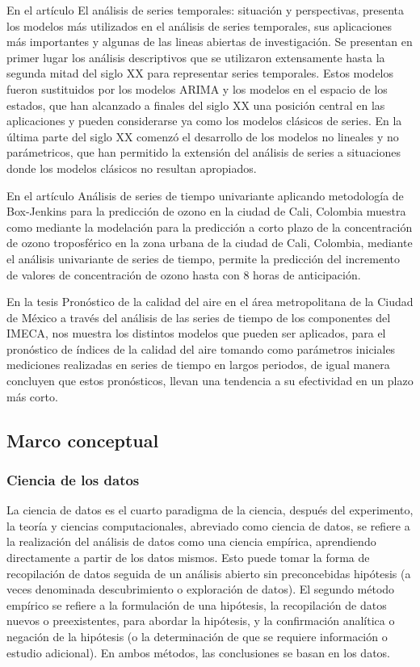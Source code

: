 En el artículo El análisis de series temporales: situación y perspectivas, presenta los modelos más utilizados en el análisis de series temporales, sus aplicaciones más importantes y algunas de las lineas abiertas de investigación. Se presentan en primer lugar los análisis descriptivos que se utilizaron extensamente hasta la segunda mitad del siglo XX para representar series temporales. Estos modelos fueron sustituidos por los modelos ARIMA y los modelos en el espacio de los estados, que han alcanzado a finales del siglo XX una posición central en las aplicaciones y pueden considerarse ya como los modelos clásicos de series. En la última parte del siglo XX comenzó el desarrollo de los modelos no lineales y no parámetricos, que han permitido la extensión del análisis de series a situaciones donde los modelos clásicos no resultan apropiados. \cite{DPSSANCHEZDERIVERA}

En el artículo Análisis de series de tiempo univariante aplicando metodología de Box-Jenkins para la predicción de ozono en la ciudad de Cali, Colombia muestra como mediante la modelación para la predicción a corto plazo de la concentración de ozono troposférico en la zona urbana de la ciudad de Cali, Colombia, mediante el análisis univariante de series de tiempo, permite la predicción del incremento de valores de concentración de ozono  hasta con 8 horas de anticipación. \cite{JARAMILLOAYERBE2007}

En la tesis Pronóstico de la calidad del aire en el área metropolitana de la Ciudad de México a través del análisis de las series de tiempo de los componentes del IMECA, nos muestra los distintos modelos que pueden ser aplicados, para el pronóstico de índices de la calidad del aire tomando como parámetros iniciales mediciones realizadas en series de tiempo en largos periodos, de igual manera concluyen que estos pronósticos, llevan una tendencia  a su efectividad en un plazo más corto. 
\cite{MLCECILIA2011} 

\subsection{Marco conceptual}

\subsubsection{Ciencia de los datos}

La ciencia de datos es el cuarto paradigma de la ciencia, después del experimento, la teoría y ciencias computacionales, abreviado como ciencia de datos, se refiere a la realización del análisis de datos como una ciencia empírica, aprendiendo directamente a partir de los datos mismos. Esto puede tomar la forma de recopilación de datos seguida de un análisis abierto sin preconcebidas hipótesis (a veces denominada descubrimiento o exploración de datos). El segundo método empírico se refiere a la formulación de una hipótesis, la recopilación de datos nuevos o preexistentes, para abordar la hipótesis, y la confirmación analítica o negación de la hipótesis (o la determinación de que se requiere información o estudio adicional). En ambos métodos, las conclusiones se basan en los datos. 

